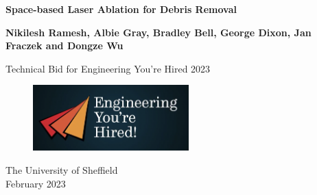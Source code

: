 
\begin{titlepage}
    \begin{center}
        \vspace*{1cm}

        \Huge
        \textbf{Space-based Laser Ablation for Debris Removal}

        \vspace{1.5cm}

        \Large
        \textbf{Nikilesh Ramesh, Albie Gray, Bradley Bell, George Dixon, Jan Fraczek and Dongze Wu}

        \vfill

        \large
        Technical Bid for Engineering You're Hired 2023
        \begin{figure}[htp]
            \centering
            \includegraphics[width=6cm]{Images/EYH.png}
            \label{fig:EYH}
        \end{figure}

        The University of Sheffield \\
        February 2023
    \end{center}
\end{titlepage}